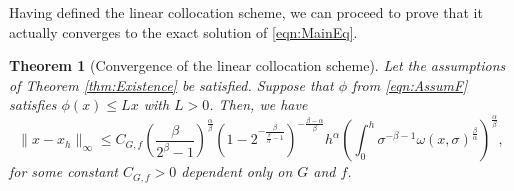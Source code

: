 \documentclass[12pt,a4paper]{article}
\newtheorem{thm}{Theorem}
\begin{document}
Having defined the linear collocation scheme, we can proceed to prove that it actually converges to the exact solution of \eqref{eqn:MainEq}. 
\begin{thm}[Convergence of the linear collocation scheme]\label{thm:LinearCollocationConvergence}
	Let the assumptions of Theorem \ref{thm:Existence} be satisfied. Suppose that $\phi$ from \eqref{eqn:AssumF} satisfies $\phi(x) \leq L x$ with $L>0$. Then, we have
	\begin{equation}\label{eqn:LinearCollocationError}
		\|x - x_h\|_\infty \leq C_{G,f} \left(\frac{\beta}{2^{\beta}-1}\right)^\frac{\alpha}{\beta} \left(1-2^{-\frac{\beta}{\frac{\beta}{\alpha}-1}}\right)^{-\frac{\beta - \alpha}{\beta}}h^\alpha \left(\int_0^h \sigma^{-\beta-1} \omega(x,\sigma)^\frac{\beta}{\alpha}\right)^\frac{\alpha}{\beta},
	\end{equation}
	for some constant $C_{G,f}>0$ dependent only on $G$ and $f$. 
\end{thm}
\end{document}
